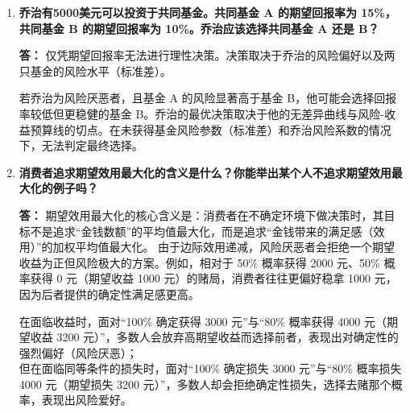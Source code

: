 \begin{enumerate}[label=\textbf{\arabic*.}, leftmargin=*]
\begin{center}
		\end{center}
		\item \textbf{乔治有5000美元可以投资于共同基金。共同基金 A 的期望回报率为 15\%，共同基金 B 的期望回报率为 10\%。乔治应该选择共同基金 A 还是 B？}
		
		\textbf{答：}
		仅凭期望回报率无法进行理性决策。决策取决于乔治的风险偏好以及两只基金的风险水平（标准差）。
		
		若乔治为风险厌恶者，且基金 A 的风险显著高于基金 B，他可能会选择回报率较低但更稳健的基金 B。乔治的最优决策取决于他的无差异曲线与风险-收益预算线的切点。在未获得基金风险参数（标准差）和乔治风险系数的情况下，无法判定最终选择。
		
		\item \textbf{消费者追求期望效用最大化的含义是什么？你能举出某个人不追求期望效用最大化的例子吗？}
		
		\textbf{答：}
		期望效用最大化的核心含义是：消费者在不确定环境下做决策时，其目标不是追求“金钱数额”的平均值最大化，而是追求“金钱带来的满足感（效用）”的加权平均值最大化。
		由于边际效用递减，风险厌恶者会拒绝一个期望收益为正但风险极大的方案。例如，相对于 50\% 概率获得 2000 元、50\% 概率获得 0 元（期望收益 1000 元）的赌局，消费者往往更偏好稳拿 1000 元，因为后者提供的确定性满足感更高。
		
		在面临收益时，面对“100\% 确定获得 3000 元”与“80\% 概率获得 4000 元（期望收益 3200 元）”，多数人会放弃高期望收益而选择前者，表现出对确定性的强烈偏好（风险厌恶）；\\
		但在面临同等条件的损失时，面对“100\% 确定损失 3000 元”与“80\% 概率损失 4000 元（期望损失 3200 元）”，多数人却会拒绝确定性损失，选择去赌那个概率，表现出风险爱好。
		

\end{enumerate}
